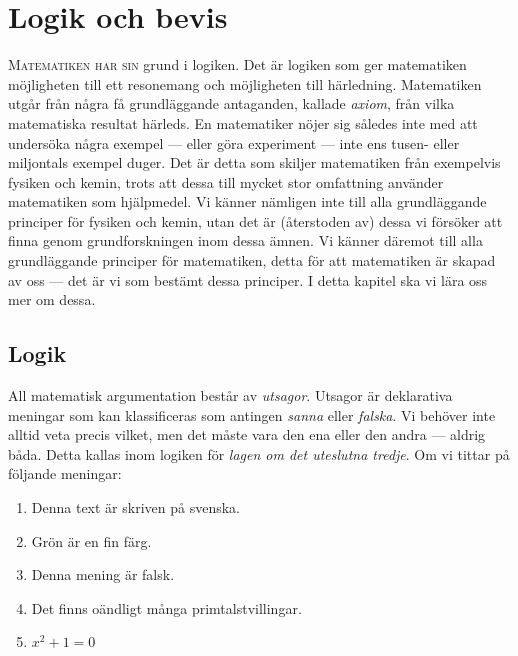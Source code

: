 \chapter{Logik och bevis}%
\label{ch:Logik}
\lettrine{M}{atematiken har sin} grund i logiken.
Det är logiken som ger matematiken möjligheten till ett resonemang och
möjligheten till härledning.
Matematiken utgår från några få grundläggande antaganden, kallade \emph{axiom}, 
från vilka matematiska resultat härleds.
En matematiker nöjer sig således inte med att undersöka några exempel --- eller
göra experiment --- inte ens tusen- eller miljontals exempel duger.
Det är detta som skiljer matematiken från exempelvis fysiken och kemin, trots
att dessa till mycket stor omfattning använder matematiken som hjälpmedel.
Vi känner nämligen inte till alla grundläggande principer för fysiken och 
kemin, utan det är (återstoden av) dessa vi försöker att finna genom 
grundforskningen inom dessa ämnen.
Vi känner däremot till alla grundläggande principer för matematiken, detta för
att matematiken är skapad av oss --- det är vi som bestämt dessa principer.
I detta kapitel ska vi lära oss mer om dessa.


\section{Logik}

All matematisk argumentation består av \emph{utsagor}.
Utsagor är deklarativa meningar som kan klassificeras som 
antingen \emph{sanna} eller \emph{falska}.
Vi behöver inte alltid veta precis vilket, men det måste vara den ena eller den
andra --- aldrig båda.
Detta kallas inom logiken för \emph{lagen om det uteslutna tredje}.
Om vi tittar på följande meningar:
\begin{enumerate}
  \item Denna text är skriven på svenska.
  \item Grön är en fin färg.
  \item Denna mening är falsk.
  \item Det finns oändligt många primtalstvillingar.
  \item \(x^2+1=0\)
\end{enumerate}

